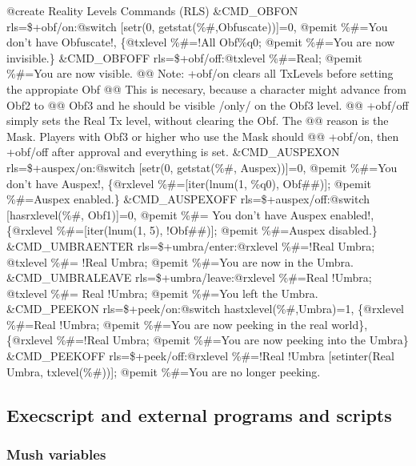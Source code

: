 \documentclass[letterpaper,10pt,english]{sphinxmanual}
\begin{document}
\sphinxAtStartPar
@create Reality Levels Commands (RLS)
\&CMD\_OBFON rls=\$+obf/on:@switch {[}setr(0, getstat(\%\#,Obfuscate)){]}=0, @pemit
\%\#=You don’t have Obfuscate!, \{@txlevel \%\#=!All Obf\%q0; @pemit \%\#=You are
now invisible.\}
\&CMD\_OBFOFF rls=\$+obf/off:@txlevel \%\#=Real; @pemit \%\#=You are now visible.
@@ Note: +obf/on clears all TxLevels before setting the appropiate Obf
@@ This is necesary, because a character might advance from Obf2 to
@@ Obf3 and he should be visible /only/ on the Obf3 level.
@@ +obf/off simply sets the Real Tx level, without clearing the Obf. The
@@ reason is the Mask. Players with Obf3 or higher who use the Mask should
@@ +obf/on, then +obf/off after approval and everything is set.
\&CMD\_AUSPEXON rls=\$+auspex/on:@switch {[}setr(0, getstat(\%\#, Auspex)){]}=0,
@pemit \%\#=You don’t have Auspex!, \{@rxlevel \%\#={[}iter(lnum(1, \%q0), Obf\#\#){]};
@pemit \%\#=Auspex enabled.\}
\&CMD\_AUSPEXOFF rls=\$+auspex/off:@switch {[}hasrxlevel(\%\#, Obf1){]}=0, @pemit \%\#=
You don’t have Auspex enabled!, \{@rxlevel \%\#={[}iter(lnum(1, 5), !Obf\#\#){]};
@pemit \%\#=Auspex disabled.\}
\&CMD\_UMBRAENTER rls=\$+umbra/enter:@rxlevel \%\#=!Real Umbra; @txlevel \%\#=
!Real Umbra; @pemit \%\#=You are now in the Umbra.
\&CMD\_UMBRALEAVE rls=\$+umbra/leave:@rxlevel \%\#=Real !Umbra; @txlevel \%\#=
Real !Umbra; @pemit \%\#=You left the Umbra.
\&CMD\_PEEKON rls=\$+peek/on:@switch hastxlevel(\%\#,Umbra)=1, \{@rxlevel \%\#=Real
!Umbra; @pemit \%\#=You are now peeking in the real world\}, \{@rxlevel \%\#=!Real
Umbra; @pemit \%\#=You are now peeking into the Umbra\}
\&CMD\_PEEKOFF rls=\$+peek/off:@rxlevel \%\#=!Real !Umbra {[}setinter(Real Umbra,
txlevel(\%\#)){]}; @pemit \%\#=You are no longer peeking.


\subsection{Execscript and external programs and scripts}
\label{\detokenize{advanced:execscript-and-external-programs-and-scripts}}

\subsubsection{Mush variables}
\label{\detokenize{advanced:mush-variables}}
\end{document}
